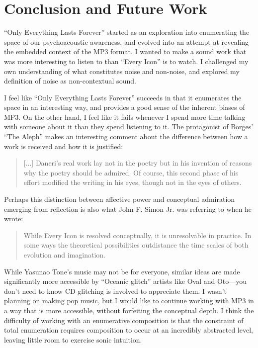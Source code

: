 \documentclass{thesis}
\begin{document}
\chapter{Conclusion and Future Work}

``Only Everything Lasts Forever'' started as an exploration into enumerating the space of our psychoacoustic awareness, and evolved into an attempt at revealing the embedded context of the MP3 format. I wanted to make a sound work that was more interesting to listen to than ``Every Icon'' is to watch. I challenged my own understanding of what constitutes noise and non-noise, and explored my definition of noise as non-contextual sound.

I feel like ``Only Everything Lasts Forever'' succeeds in that it enumerates the space in an interesting way, and provides a good sense of the inherent biases of MP3. On the other hand, I feel like it fails whenever I spend more time talking with someone about it than they spend listening to it. The protagonist of Borges' ``The Aleph'' makes an interesting comment about the difference between how a work is received and how it is justified:
	
	\begin{quote}
	[...] Daneri's real work lay not in the poetry but in his invention of reasons why the poetry should be admired. Of course, this second phase of his effort modified the writing in his eyes, though not in the eyes of others.
	\end{quote}
	
Perhaps this distinction between affective power and conceptual admiration emerging from reflection is also what John F. Simon Jr. was referring to when he wrote:
	
	\begin{quote}
	While Every Icon is resolved conceptually, it is unresolvable in practice. In some ways the theoretical possibilities outdistance the time scales of both evolution and imagination.\cite{john_f._simon_jr._given:32_1997}
	\end{quote}

While Yasunao Tone's music may not be for everyone, similar ideas are made significantly more accessible by ``Oceanic glitch''\cite{Sangild04} artists like Oval and Oto---you don't need to know CD glitching is involved to appreciate them. I wasn't planning on making pop music, but I would like to continue working with MP3 in a way that is more accessible, without forfeiting the conceptual depth. I think the difficulty of working with an enumerative composition is that the constraint of total enumeration requires composition to occur at an incredibly abstracted level, leaving little room to exercise sonic intuition.
\end{document}
